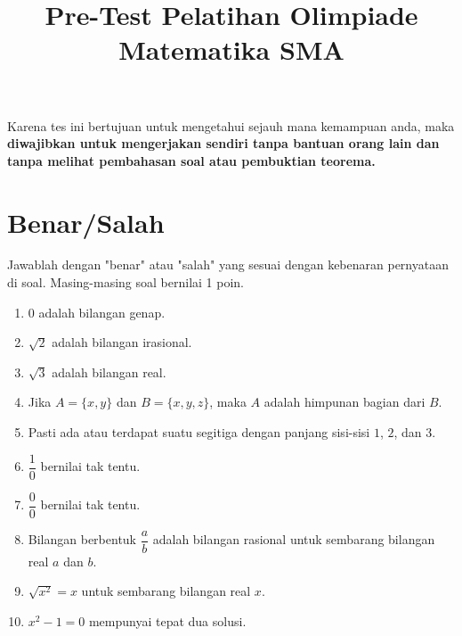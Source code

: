 \documentclass[12pt]{scrartcl}
\title{Pre-Test Pelatihan Olimpiade Matematika SMA}
\date{}
\begin{document}
	\maketitle
	Karena tes ini bertujuan untuk mengetahui sejauh mana kemampuan anda, maka
	\textbf{diwajibkan untuk mengerjakan sendiri tanpa bantuan orang lain dan tanpa melihat pembahasan soal atau pembuktian teorema.}

\section{Benar/Salah}
Jawablah dengan "benar" atau "salah" yang sesuai dengan kebenaran pernyataan di soal. Masing-masing soal bernilai 1 poin.
\begin{enumerate}
	\item 0 adalah bilangan genap.
	
	\item $\sqrt{2}$ adalah bilangan irasional.
	
	\item $\sqrt{3}$ adalah bilangan real.
	
	\item Jika $A = \{x,y\}$ dan $B = \{x,y,z\}$, maka $A$ adalah himpunan bagian dari $B$.
	
	\item Pasti ada atau terdapat suatu segitiga dengan panjang sisi-sisi $1$, $2$, dan $3$.
	
	\item $\dfrac{1}{0}$ bernilai tak tentu.
	
	\item $\dfrac{0}{0}$ bernilai tak tentu.
	
	\item Bilangan berbentuk $\dfrac{a}{b}$ adalah bilangan rasional untuk sembarang bilangan real $a$ dan $b$.
	
	\item $\sqrt{x^2} = x$ untuk sembarang bilangan real $x$.
	
	\item $x^2-1=0$ mempunyai tepat dua solusi.
\end{enumerate}
\end{document}
